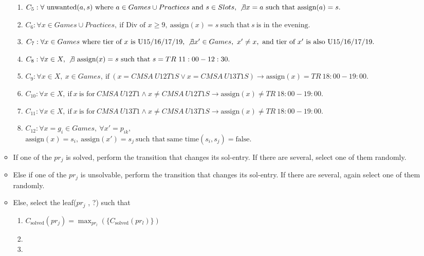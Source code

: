 \documentclass[12 pt]{article}        	%
\begin{document}
\begin{itemize}
\begin{itemize}
\begin{enumerate}
            \item $C_5: \forall \ \text{unwanted}(a, s) \ \text{where} \ a \in Games \cup Practices \ \text{and} \ s \in Slots, \ \not\exists x = a \ \text{such that} \ \text{assign}(a) = s.$
            \item $C_6: \forall x \in Games \cup Practices, \ \text{if Div of } x \geq 9, \ \text{assign}(x) = s \ \text{such that} \ s \ \text{is in the evening.}$
            \item $C_7: \forall x \in Games \ \text{where tier of} \ x \ \text{is U15/16/17/19}, \ \not\exists x' \in Games, \ x' \neq x, \ \text{and tier of} \ x' \ \text{is also U15/16/17/19}.$
            \item $C_8: \forall x \in X, \ \not\exists \ \text{assign}(x) = s \ \text{such that} \ s = TR \ 11:00 - 12:30.$
            \item $C_9: \forall x \in X, \ x \in Games, \ \text{if} \ (x = CMSA \ U12T1S \lor x = CMSA \ U13T1S) \rightarrow \text{assign}(x) = TR \ 18:00 - 19:00.$
            \item $C_{10}: \forall x \in X, \ \text{if} \ x \ \text{is for} \ CMSA \ U12T1 \land x \neq CMSA \ U12T1S \rightarrow \text{assign}(x) \neq TR \ 18:00 - 19:00.$
            \item $C_{11}: \forall x \in X, \ \text{if} \ x \ \text{is for} \ CMSA \ U13T1 \land x \neq CMSA \ U13T1S \rightarrow \text{assign}(x) \neq TR \ 18:00 - 19:00.$
            \item $C_{12}: \forall x = g_i \in Games, \ \forall x' = p_{ik}, $\\ $\text{assign}(x) = s_i, \ \text{assign}(x') = s_j \ \text{such that} \ \text{same time}(s_i, s_j) = \text{false}.$
        \end{enumerate}
        \item If one of the $pr_j$ is solved, perform the transition that changes its sol-entry. If there are several, select one of them randomly.
        \item Else if one of the $pr_j$ is unsolvable, perform the transition that changes its sol-entry. If there are several, again select one of them randomly.
        \item Else, select the leaf($pr_j$ , ?) such that
        \begin{enumerate}
            \item $C_{\text{solved}}(pr_j) = \max_{pr_l}(\{C_{\text{solved}}(pr_l)\})$
            \item {}
            \item {}
        \end{enumerate} 
    \end{itemize}
\end{itemize}
\end{document}
